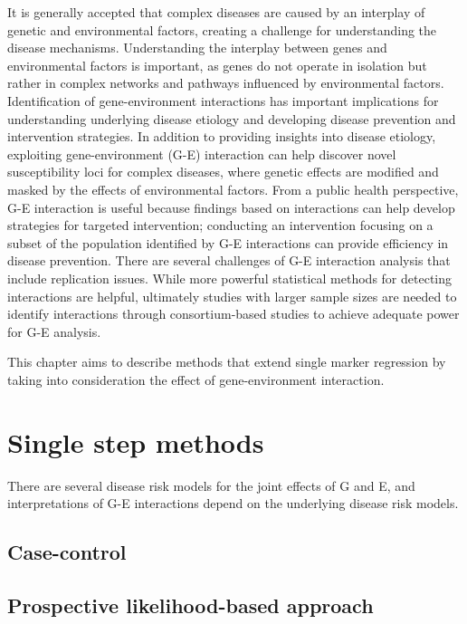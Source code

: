 \documentclass[]{book}
\theoremstyle{definition}
\theoremstyle{definition}
\theoremstyle{definition}
\theoremstyle{remark}
\begin{document}
It is generally accepted that complex diseases are caused by an
interplay of genetic and environmental factors, creating a challenge for
understanding the disease mechanisms. Understanding the interplay
between genes and environmental factors is important, as genes do not
operate in isolation but rather in complex networks and pathways
influenced by environmental factors. Identification of gene-environment
interactions has important implications for understanding underlying
disease etiology and developing disease prevention and intervention
strategies. In addition to providing insights into disease etiology,
exploiting gene-environment (G-E) interaction can help discover novel
susceptibility loci for complex diseases, where genetic effects are
modified and masked by the effects of environmental factors. From a
public health perspective, G-E interaction is useful because findings
based on interactions can help develop strategies for targeted
intervention; conducting an intervention focusing on a subset of the
population identified by G-E interactions can provide efficiency in
disease prevention. There are several challenges of G-E interaction
analysis that include replication issues. While more powerful
statistical methods for detecting interactions are helpful, ultimately
studies with larger sample sizes are needed to identify interactions
through consortium-based studies to achieve adequate power for G-E
analysis.

This chapter aims to describe methods that extend single marker
regression by taking into consideration the effect of gene-environment
interaction.

\section{Single step methods}\label{single-step-methods}

There are several disease risk models for the joint effects of G and E,
and interpretations of G-E interactions depend on the underlying disease
risk models.

\subsection{Case-control}\label{case-control}

\subsection{Prospective likelihood-based
approach}\label{prospective-likelihood-based-approach}
\end{document}
